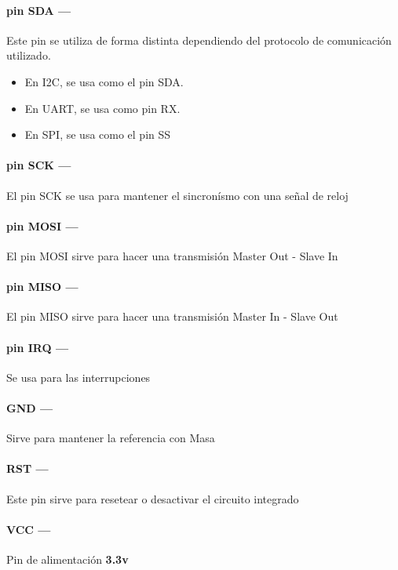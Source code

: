 \documentclass[../informe_krapp.tex]{subfiles}
\begin{document}

\paragraph{pin SDA ---}
Este pin se utiliza de forma distinta dependiendo del protocolo
de comunicación utilizado.
\begin{itemize}
	\item En I2C, se usa como el pin SDA.
	\item En UART, se usa como pin RX.
	\item En SPI, se usa como el pin SS
\end{itemize}

\paragraph{pin SCK ---}
El pin SCK se usa para mantener el sincronísmo con una señal de reloj

\paragraph{pin MOSI ---}
El pin MOSI sirve para hacer una transmisión Master Out - Slave In

\paragraph{pin MISO ---}
El pin MISO sirve para hacer una transmisión Master In - Slave Out

\paragraph{pin IRQ ---}
Se usa para las interrupciones

\paragraph{GND ---}
Sirve para mantener la referencia con Masa

\paragraph{RST ---}
Este pin sirve para resetear o desactivar el circuito integrado

\paragraph{VCC ---}
Pin de alimentación \textbf{3.3v}
\end{document}

